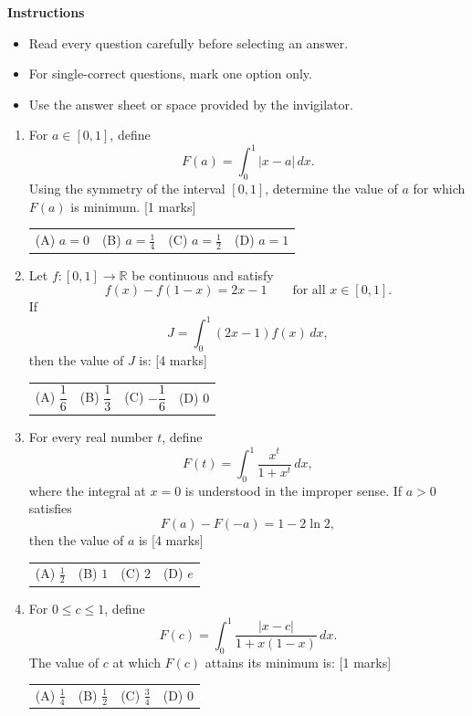 \documentclass[11pt,a4paper]{article}
\begin{document}
\textbf{Instructions}
\begin{itemize}[topsep=2pt]
\item Read every question carefully before selecting an answer.
\item For single-correct questions, mark one option only.
\item Use the answer sheet or space provided by the invigilator.
\end{itemize}
\begin{enumerate}[resume]
\item For $a\in[0,1]$, define
\[
F(a)=\int_0^1 |x-a|\,dx.
\]
Using the symmetry of the interval $[0,1]$, determine the value of $a$ for which $F(a)$ is minimum. \hfill [1 marks]
{\renewcommand{\arraystretch}{1.8}
\begin{tabularx}{\linewidth}{X X X X}
(A) \quad $a=0$ & (B) \quad $a=\frac14$ & (C) \quad $a=\frac12$ & (D) \quad $a=1$ \\[10pt]
\end{tabularx}}
\item Let $f:[0,1]\to\mathbb{R}$ be continuous and satisfy
\[
f(x)-f(1-x)=2x-1\qquad\text{for all }x\in[0,1].
\]
If
\[
J=\int_0^1(2x-1)f(x)\,dx,
\]
then the value of $J$ is: \hfill [4 marks]
{\renewcommand{\arraystretch}{1.8}
\begin{tabularx}{\linewidth}{X X X X}
(A) \quad $\dfrac{1}{6}$ & (B) \quad $\dfrac{1}{3}$ & (C) \quad $-\dfrac{1}{6}$ & (D) \quad $0$ \\[10pt]
\end{tabularx}}
\item For every real number $t$, define
\[
F(t)=\int_0^1 \frac{x^t}{1+x^t}\,dx,
\]
where the integral at $x=0$ is understood in the improper sense. If $a>0$ satisfies
\[
F(a)-F(-a)=1-2\ln 2,
\]
then the value of $a$ is \hfill [4 marks]
{\renewcommand{\arraystretch}{1.8}
\begin{tabularx}{\linewidth}{X X X X}
(A) \quad $\frac12$ & (B) \quad $1$ & (C) \quad $2$ & (D) \quad $e$ \\[10pt]
\end{tabularx}}
\item For $0\le c\le 1$, define
\[
F(c)=\int_0^1\frac{|x-c|}{1+x(1-x)}\,dx.
\]
The value of $c$ at which $F(c)$ attains its minimum is: \hfill [1 marks]
{\renewcommand{\arraystretch}{1.8}
\begin{tabularx}{\linewidth}{X X X X}
(A) \quad $\frac14$ & (B) \quad $\frac12$ & (C) \quad $\frac34$ & (D) \quad $0$ \\[10pt]
\end{tabularx}}

\end{enumerate}
\end{document}
